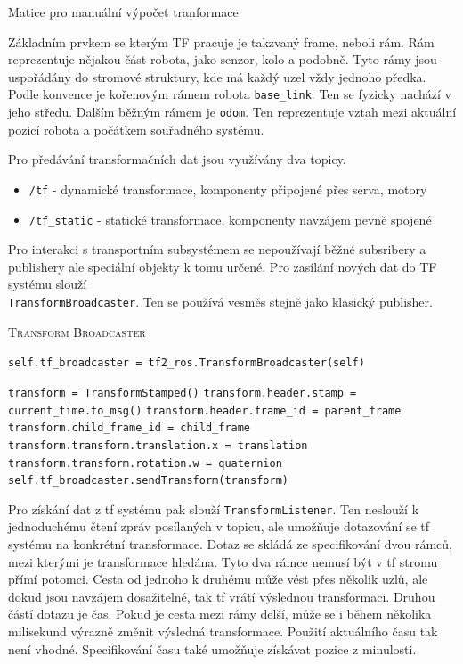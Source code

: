 \begin{center}
	Matice pro manuální výpočet tranformace
\end{center}

Základním prvkem se kterým TF pracuje je takzvaný frame, neboli rám. Rám reprezentuje nějakou část robota, jako senzor, kolo a podobně. Tyto rámy jsou uspořádány do stromové struktury, kde má každý uzel vždy jednoho předka. Podle konvence je kořenovým rámem robota \verb|base_link|. Ten se fyzicky nachází v jeho středu. Dalším běžným rámem je \verb|odom|. Ten reprezentuje vztah mezi aktuální pozicí robota a počátkem souřadného systému. \cite{ros_reps}

Pro předávání transformačních dat jsou využívány dva topicy.
\begin{itemize}
	\item {\verb|/tf| - dynamické transformace, komponenty připojené přes serva, motory}
	\item {\verb|/tf_static| - statické transformace, komponenty navzájem pevně spojené}
\end{itemize}
Pro interakci s transportním subsystémem se nepoužívají běžné subsribery a publishery ale speciální objekty k tomu určené.
Pro zasílání nových dat do TF systému slouží \\ \verb|TransformBroadcaster|. Ten se používá vesměs stejně jako klasický publisher.  \cite{ros2_documentation} 

\begin{algorithm}[h!]
	\label{}
	\caption{\textsc{Transform Broadcaster}}
	
	\DontPrintSemicolon
	\SetAlgoNoLine
	\SetNlSty{}{}{:}
	\SetNlSkip{-1.1em}
	
	\BlankLine \Indp\Indpp
	
    \texttt{self.tf\_broadcaster = tf2\_ros.TransformBroadcaster(self)}\;
 
 	\BlankLine
	\texttt{transform = TransformStamped()}\;
	\texttt{transform.header.stamp = current\_time.to\_msg()}\;
	\texttt{transform.header.frame\_id = parent\_frame}\;
	\texttt{transform.child\_frame\_id = child\_frame}\;
	\texttt{transform.transform.translation.x = translation}\;
	\texttt{transform.transform.rotation.w = quaternion}\;
	\texttt{self.tf\_broadcaster.sendTransform(transform)}\;
	
\end{algorithm}

\newpage
Pro získání dat z tf systému pak slouží \verb|TransformListener|. Ten neslouží k jednoduchému čtení zpráv posílaných v topicu, ale umožňuje dotazování se tf systému na konkrétní transformace. Dotaz se skládá ze specifikování dvou rámců, mezi kterými je transformace hledána. Tyto dva rámce nemusí být v tf stromu přímí potomci. Cesta od jednoho k druhému může vést přes několik uzlů, ale dokud jsou navzájem dosažitelné, tak tf vrátí výslednou transformaci. Druhou částí dotazu je čas. Pokud je cesta mezi rámy delší, může se i během několika milisekund výrazně změnit výsledná transformace. Použití aktuálního času tak není vhodné. Specifikování času také umožňuje získávat pozice z minulosti. \cite{ros2_documentation} 

